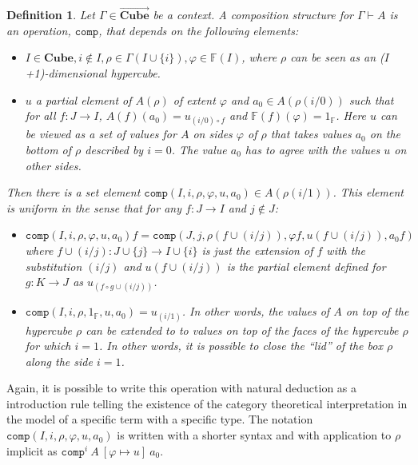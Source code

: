 \documentclass[12pt,a4paper,twoside,xetex]{book} %
\newcommand{\keyword}[1]{\emph{#1}\index{#1}}
\newtheorem{definition}[theorem]{Definition}
\newcommand{\psh}[1]{\overrightarrow{#1}}
\newcommand{\op}[1]{\mathtt{#1}}
\newcommand{\cube}[0]{\textbf{Cube}}
\newcommand{\compt}[5]{\op{comp}^{#1} \ {#2} \ \left[{#3} \mapsto {#4} \right] \ {#5}}
\begin{document}
\begin{definition}\label{compdef}
Let $\Gamma \in \psh{\cube}$ be a context. A \keyword{composition structure} for $\Gamma \vdash A$ is an operation, 
$\op{comp}$, that depends on the following elements:

\begin{itemize}
\item $I \in \cube, i \not \in I, \rho \in \Gamma(I \cup \{i\}), \varphi 
\in \mathbb{F}(I)$, where $\rho$ can be seen as an ($I$+1)-dimensional 
hypercube.
\item $u$ a partial element of $A(\rho)$ of extent $\varphi$ and $a_0 \in 
A(\rho (i/0))$ such that for all $f:J\rightarrow I$, $A(f)(a_0) = u _{(i/0) 
\circ f}$ and $\mathbb{F}(f)(\varphi) = 1_{\mathbb{F}}$. Here $u$ can be viewed 
as a set of values for $A$ on sides $\varphi$ of $\rho$ that takes values $a_0$ 
on the bottom of $\rho$ described by $i=0$. The value $a_0$ has to agree with 
the values $u$ on other sides.
\end{itemize}

Then there is a set element $\op{comp}(I,i,\rho,\varphi, u,a_0)\in 
A(\rho(i/1))$. This element is uniform in the sense that for any $f:J 
\rightarrow I$ and $j \not \in J$: 

\begin{itemize}
\item $\op{comp} \left(I,i,\rho,\varphi, u , a_0 \right) f = 
\op{comp}(J,j,\rho(f \cup (i/j)), \varphi f, u(f \cup (i/j)), a_0 f)$  where $f 
\cup (i/j): J \cup \{j\} \rightarrow I \cup \{i\}$ is just the extension of $f$ 
with the substitution $(i/j)$ and $u(f \cup (i/j))$ is the partial element 
defined for $g: K \rightarrow J$ as $u_{(f \circ g \cup (i/j))}$.

\item $\op{comp}(I,i,\rho, 1_{\mathbb{F}}, u, a_0) = u_{(i/1)}$. In other 
words, the values of $A$ on top of the hypercube $\rho$ can be extended to to 
values on top of the faces of the hypercube $\rho$ for which $i=1$. In other 
words, it is possible to close the ``lid'' of the box $\rho$ along the side 
$i=1$.

\end{itemize}



\end{definition}



Again, it is possible to write this operation with natural deduction as a introduction rule telling the 
existence of the category theoretical interpretation in the model of a specific 
term with a specific type. The notation $\op{comp}(I,i,\rho, \varphi, u, a_0)$ 
is written with a shorter syntax and with application to $\rho$ implicit as 
$\compt{i}{A}{\varphi}{u}{a_0}$.
\end{document}
